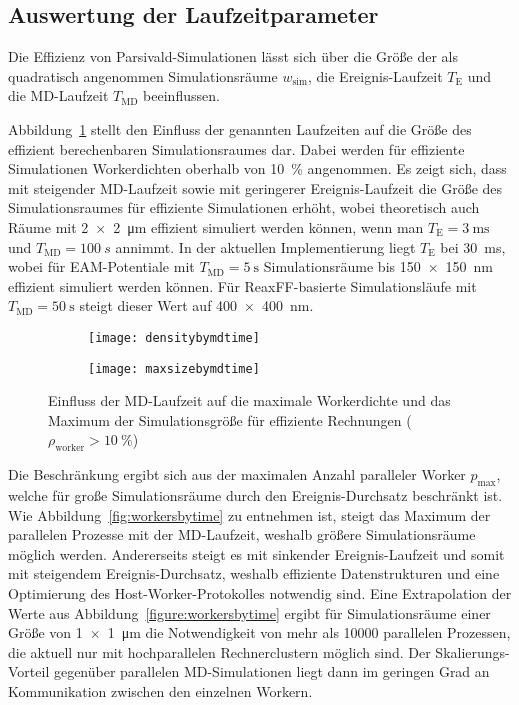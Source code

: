 \subsection{Auswertung der Laufzeitparameter}

Die Effizienz von Parsivald-Simulationen lässt sich über die Größe der als quadratisch angenommen Simulationsräume $w_\text{sim}$, die Ereignis-Laufzeit $T_\text{E}$ und die MD-Laufzeit $T_\text{MD}$ beeinflussen.

Abbildung~\ref{fig:densitymaxsize} stellt den Einfluss der genannten Laufzeiten auf die Größe des effizient berechenbaren Simulationsraumes dar.
Dabei werden für effiziente Simulationen  Workerdichten oberhalb von \SI{10}{\percent} angenommen.
Es zeigt sich, dass mit steigender MD-Laufzeit sowie mit geringerer Ereignis-Laufzeit die Größe des Simulationsraumes für effiziente Simulationen erhöht, wobei theoretisch auch Räume mit \SI{2x2}{\micro\meter} effizient simuliert werden können, wenn man $T_\text{E} = \SI{3}{\milli\second}$ und $T_\text{MD}=\SI{100}{s}$ annimmt.
In der aktuellen Implementierung liegt $T_\text{E}$ bei \SI{30}{\milli\second}, wobei für EAM-Potentiale mit $T_\text{MD}=\SI{5}{\second}$ Simulationsräume bis \SI{150x150}{\nano\meter} effizient simuliert werden können.
Für ReaxFF-basierte Simulationsläufe mit $T_\text{MD}=\SI{50}{\second}$ steigt dieser Wert auf \SI{400x400}{\nano\meter}.

\begin{figure}[hbp]
  
  \captionsetup[subfigure]{singlelinecheck=false}
  \def\subfigwidth{7cm}
  \begin{subfigure}[t]{\subfigwidth}
    \texttt{[image: densitybymdtime]}
  \end{subfigure}
  \hfill
  \begin{subfigure}[t]{\subfigwidth}
    \texttt{[image: maxsizebymdtime]}
  \end{subfigure}

  \caption{Einfluss der MD-Laufzeit auf die maximale Workerdichte und das Maximum der Simulationsgröße für effiziente Rechnungen ($\rho_\text{worker} > \SI{10}{\percent}$)}
  \label{fig:densitymaxsize}
  
\end{figure}

Die Beschränkung ergibt sich aus der maximalen Anzahl paralleler Worker $p_\text{max}$, welche für große Simulationsräume durch den Ereignis-Durchsatz beschränkt ist.
Wie Abbildung~\ref{fig:workersbytime} zu entnehmen ist, steigt das Maximum der parallelen Prozesse mit der MD-Laufzeit, weshalb größere Simulationsräume möglich werden.
Andererseits steigt es mit sinkender Ereignis-Laufzeit und somit mit steigendem Ereignis-Durchsatz, weshalb effiziente Datenstrukturen und eine Optimierung des Host-Worker-Protokolles notwendig sind.
Eine Extrapolation der Werte aus Abbildung~\ref{figure:workersbytime} ergibt für Simulationsräume einer Größe von \SI{1x1}{\micro\meter} die Notwendigkeit von mehr als \num{10000} parallelen Prozessen, die aktuell nur mit hochparallelen Rechnerclustern möglich sind.
Der Skalierungs-Vorteil gegenüber parallelen MD-Simulationen liegt dann im geringen Grad an Kommunikation zwischen den einzelnen Workern.

